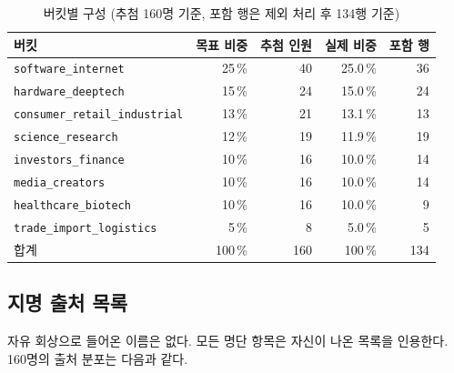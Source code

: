 \documentclass[11pt]{article}
\begin{document}
\begin{table}[h]
\centering
\caption{버킷별 구성 (추첨 160명 기준, 포함 행은 제외 처리 후 134행 기준)}
\begin{tabular}{L R R R R}
\toprule
버킷 & 목표 비중 & 추첨 인원 & 실제 비중 & 포함 행 \\
\midrule
\texttt{software\_internet}           & 25\,\% & 40 & 25.0\,\% & 36 \\
\texttt{hardware\_deeptech}           & 15\,\% & 24 & 15.0\,\% & 24 \\
\texttt{consumer\_retail\_industrial} & 13\,\% & 21 & 13.1\,\% & 13 \\
\texttt{science\_research}            & 12\,\% & 19 & 11.9\,\% & 19 \\
\texttt{investors\_finance}           & 10\,\% & 16 & 10.0\,\% & 14 \\
\texttt{media\_creators}              & 10\,\% & 16 & 10.0\,\% & 14 \\
\texttt{healthcare\_biotech}          & 10\,\% & 16 & 10.0\,\% & \phantom{0}9 \\
\texttt{trade\_import\_logistics}     & \phantom{0}5\,\% & \phantom{0}8 & \phantom{0}5.0\,\% & \phantom{0}5 \\
\midrule
합계 & 100\,\% & 160 & 100\,\% & 134 \\
\bottomrule
\end{tabular}
\end{table}

\subsection{지명 출처 목록}

자유 회상으로 들어온 이름은 없다. 모든 명단 항목은 자신이 나온 목록을 인용한다.
160명의 출처 분포는 다음과 같다.
\end{document}
